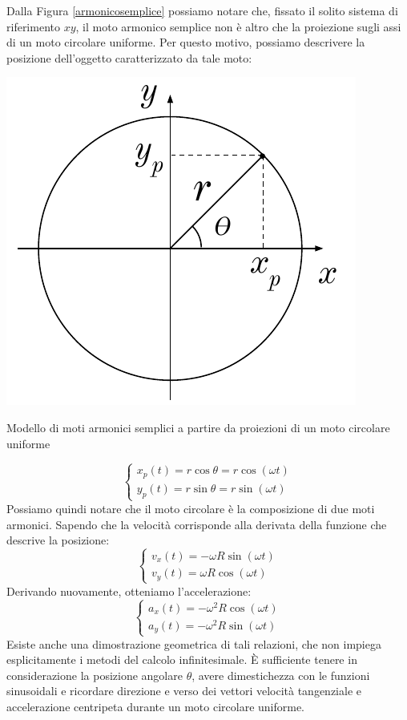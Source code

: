 Dalla Figura \ref{armonicosemplice} possiamo notare che, fissato il solito
sistema di riferimento $xy$, il moto armonico semplice non è altro che la
proiezione sugli assi di un moto circolare uniforme. Per questo motivo,
possiamo descrivere la posizione dell'oggetto caratterizzato da tale moto:
\begin{marginfigure}
    \centering
    \includegraphics[width = \marginparwidth]{figures/armonico.pdf}
    \caption{Modello di moti armonici semplici a partire da proiezioni
    di un moto circolare uniforme}
    \label{armonicosemplice}
\end{marginfigure}
\[
    \begin{cases}
        x_p(t) = r\cos\theta = r\cos(\omega t)\\
        y_p(t) = r\sin\theta = r\sin(\omega t)
    \end{cases}
\]
Possiamo quindi notare che il moto circolare è la composizione di due moti
armonici.
Sapendo che la velocità corrisponde alla derivata della funzione che
descrive la posizione:
\[
    \begin{cases}
        v_x(t) = -\omega R \sin(\omega t)\\
        v_y(t) = \omega R \cos(\omega t)
    \end{cases}
\]
Derivando nuovamente, otteniamo l'accelerazione:
\[
    \begin{cases}
        a_x(t) = -\omega^2 R\cos(\omega t)\\
        a_y(t) = -\omega^2 R\sin(\omega t)
    \end{cases}
\]
Esiste anche una dimostrazione geometrica di tali relazioni, che non impiega
esplicitamente i metodi del calcolo infinitesimale. È sufficiente tenere in
considerazione la posizione angolare $\theta$, avere dimestichezza con le
funzioni sinusoidali e ricordare direzione e verso dei vettori velocità
tangenziale e accelerazione centripeta durante un moto circolare uniforme.

